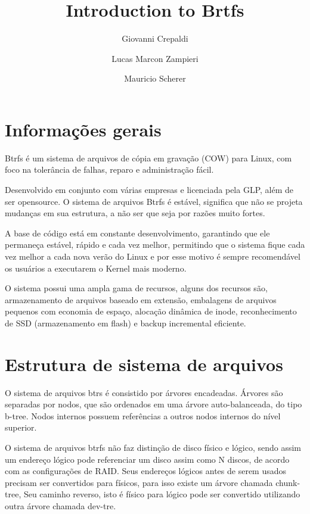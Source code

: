 \documentclass[12pt]{article}
\title{Introduction to Brtfs}
\author[1]{Giovanni Crepaldi}
\author[2]{Lucas Marcon Zampieri}
\author[3]{Mauricio Scherer}
\affil[1]{giovannecrepaldi@gmail.com}
\affil[2]{zampierilucas@unisinos.br}
\affil[3]{mauricio.sscherer@gmail.com}
\begin{document}
 

\maketitle

\section{Informações gerais} 

Btrfs é um sistema de arquivos de cópia em gravação (COW) para Linux, com foco na tolerância de
falhas, reparo e administração fácil.

Desenvolvido em conjunto com várias empresas e licenciada pela GLP, além de ser opensource.
O sistema de arquivos Btrfs é estável, significa que não se projeta mudanças em sua estrutura, a não
ser que seja por razões muito fortes.

A base de código está em constante desenvolvimento, garantindo que ele permaneça estável, rápido
e cada vez melhor, permitindo que o sistema fique cada vez melhor a cada nova verão do Linux e por
esse motivo é sempre recomendável os usuários a executarem o Kernel mais moderno.

O sistema possui uma ampla gama de recursos, alguns dos recursos são, armazenamento de arquivos baseado em extensão, embalagens de arquivos pequenos com economia de espaço, alocação dinâmica de inode, reconhecimento de SSD (armazenamento em flash) e backup incremental eficiente.


\section{Estrutura de sistema de arquivos}

O sistema de arquivos btrs é consistido por árvores encadeadas. Árvores são separadas por nodos, que são ordenados em uma árvore auto-balanceada, do tipo b-tree\cite{B-tree}. Nodos internos possuem referências a outros nodos internos do nível superior.

O sistema de arquivos btrfs não faz distinção de disco físico e lógico, sendo assim um endereço lógico pode referenciar um disco assim como N discos, de acordo com as configurações de RAID. Seus endereços lógicos antes de serem usados precisam ser convertidos para físicos, para isso existe um árvore chamada chunk-tree\cite{Btrfs-design}, Seu caminho reverso, isto é físico para lógico pode  ser convertido utilizando outra árvore chamada dev-tre.
\end{document}
